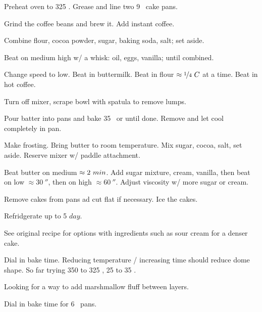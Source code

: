 \begin{preparation}
\item Preheat oven to 325 \Fahrenheit.
	Grease and line two 9 \inch~cake pans.

\item Grind the coffee beans and brew it.
	Add instant coffee.

\item Combine flour, cocoa powder, sugar, baking soda, salt; set aside.

\item Beat on medium high w/ a whisk: oil, eggs, vanilla; until combined.

\item Change speed to low.
	Beat in buttermilk.
	Beat in flour $\approx \onefourth~C$ at a time.
	Beat in hot coffee.

\item Turn off mixer, scrape bowl with spatula to remove lumps.

\item Pour batter into pans and bake 35 \minute~or until done.
	Remove and let cool completely in pan.

\item Make frosting.
	Bring butter to room temperature.
	Mix sugar, cocoa, salt, set aside.
	Reserve mixer w/ paddle attachment.

\item Beat butter on medium $\approx2~\minute$.
	Add sugar mixture, cream, vanilla, then beat on low $\approx 30~\second$, then on high $\approx 60~\second$.
	Adjust viscosity w/ more sugar or cream.

\item Remove cakes from pans ad cut flat if necessary.
	Ice the cakes.

\item Refridgerate up to 5 $day$.
\end{preparation}


\begin{variation}
\item See original recipe \cite{sallyTripleChoc2020} for options with ingredients such as sour cream for a denser cake.
\end{variation}


\begin{experiments}
\item Dial in bake time.
	Reducing temperature / increasing time should reduce dome shape.
	So far trying 350 to 325 \Fahrenheit, 25 to 35 \minute.

\item Looking for a way to add marshmallow fluff between layers.

\item Dial in bake time for 6 \inch~pans.
\end{experiments}


\recipeend
